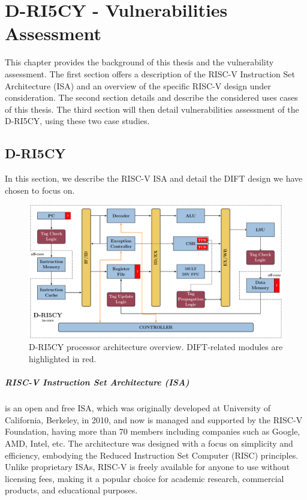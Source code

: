 \chapter{D-RI5CY - Vulnerabilities Assessment}
\label{chapter:dift_assessment}
\minitoc

This chapter provides the background of this thesis and the vulnerability assessment. The first section offers a description of the RISC-V Instruction Set Architecture (ISA) and an overview of the specific RISC-V design under consideration.
The second section details and describe the considered uses cases of this thesis.
The third section will then detail vulnerabilities assessment of the D-RI5CY, using these two case studies.

\section{D-RI5CY}
\label{section:driscy}
In this section, we describe the RISC-V ISA and detail the DIFT design we have chosen to focus on.

\begin{figure}[t]
    \centering
    \includegraphics[width=\textwidth]{c3_vulnerabilities_assessment/img/RI5CY.pdf}
    \caption{D-RI5CY processor architecture overview. DIFT-related modules are highlighted in red.}
    \label{fig:driscy}
\end{figure}

\paragraph{RISC-V Instruction Set Architecture (ISA)} is an open and free ISA, which was originally developed at University of California, Berkeley, in 2010, and now is managed and supported by the RISC-V Foundation, having more than 70 members including companies such as Google, AMD, Intel, etc. The architecture was designed with a focus on simplicity and efficiency, embodying the Reduced Instruction Set Computer (RISC) principles. Unlike proprietary ISAs, RISC-V is freely available for anyone to use without licensing fees, making it a popular choice for academic research, commercial products, and educational purposes.

